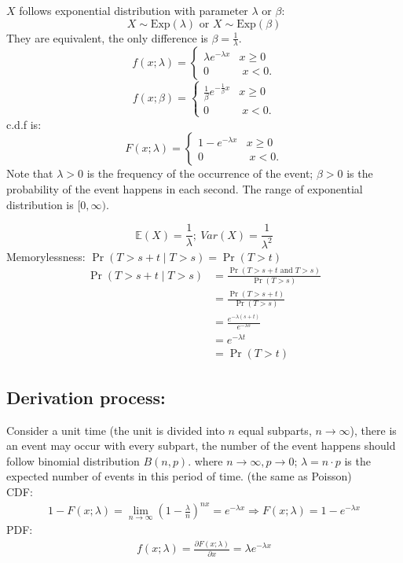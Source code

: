 \documentclass[11pt]{elegantbook}
\begin{document}
$X$ follows exponential distribution with parameter $\lambda$ or $\beta$:
$${\displaystyle X\sim {\text{Exp}}(\lambda )} \text{ or } {\displaystyle X\sim {\text{Exp}}(\beta )}$$
They are equivalent, the only difference is $\beta=\frac{1}{\lambda}$.
$${f(x;{\lambda})=\left\{{\begin{matrix}{\lambda }e^{-{\lambda }x}&x\geq 0\\0&\;x<0.\end{matrix}}\right.}$$
$${f(x;{\beta})=\left\{{\begin{matrix}{\frac{1}{\beta} }e^{-{\frac{1}{\beta} }x}&x\geq 0\\0&\;x<0.\end{matrix}}\right.}$$
c.d.f is:
$${F(x;{\lambda})=\left\{{\begin{matrix}{1-}e^{-{\lambda }x}&x\geq 0\\0&\;x<0.\end{matrix}}\right.}$$
Note that $\lambda > 0$ is the frequency of the occurrence of the event; $\beta>0$ is the probability of the event happens in each second. The range of exponential distribution is $[0,\infty)$.

$$\mathbb{E}(X)=\frac{1}{\lambda};\ Var(X)=\frac{1}{\lambda^2}$$
Memorylessness: ${\displaystyle \Pr \left(T>s+t\mid T>s\right)=\Pr(T>t)}$
\begin{equation}
    \begin{aligned}
        \Pr (T>s+t\mid T>s)&=\frac{\Pr(T>s+t\text{ and }T>s)}{\Pr(T>s)}\\
        &=\frac{\Pr(T>s+t)}{\Pr(T>s)}\\
        &=\frac{e^{-\lambda(s+t)}}{e^{-\lambda s}}\\
        &=e^{-\lambda t}\\
        &=\Pr (T>t)
    \end{aligned}
    \nonumber
\end{equation}

\subsection*{Derivation process:}

Consider a unit time (the unit is divided into $n$ equal subparts, $n \rightarrow \infty$), there is an event may occur with every subpart, the number of the event happens should follow binomial distribution $B(n,p)$. where $n \rightarrow \infty, p \rightarrow 0$; $\lambda=n\cdot p$ is the expected number of events in this period of time. (the same as Poisson)\\
CDF:
\begin{equation}
    \begin{aligned}
        1-F(x;\lambda)=\lim_{n \rightarrow \infty}(1-\frac{\lambda}{n})^{nx}=e^{-\lambda x}
        \Rightarrow F(x;\lambda)=1-e^{-\lambda x}
    \end{aligned}
    \nonumber
\end{equation}
PDF:
\begin{equation}
    \begin{aligned}
        f(x;\lambda)=\frac{\partial F(x;\lambda)}{\partial x}=\lambda e^{-\lambda x}
    \end{aligned}
    \nonumber
\end{equation}
\end{document}
